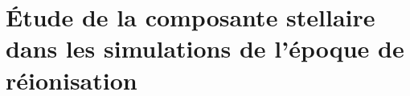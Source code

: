 \documentclass[ twoside,openright,titlepage,numbers=noenddot,headinclude,%
                footinclude=true,cleardoublepage=empty,abstractoff, %
                BCOR=5mm,paper=a4,fontsize=11pt,%
                frenchb,english,%
                ]{scrreprt}
\begin{document}
\part{Étude de la composante stellaire dans les simulations de l'époque de réionisation}



%
%
%
%
%
%
%
%
%
%
%
%
%
%
%
%
%
%
%
%
%
% 
\end{document}
